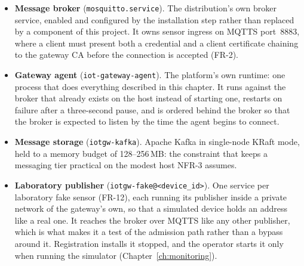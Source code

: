 \documentclass[12pt,a4paper]{report}
\begin{document}
\begin{itemize}
    \item \textbf{Message broker} (\texttt{mosquitto.service}).
    The distribution's own broker service, enabled and configured by
    the installation step rather than replaced by a component of this
    project. It owns sensor ingress on MQTTS port~8883, where a
    client must present both a credential and a client certificate
    chaining to the gateway CA before the connection is accepted
    (FR-2).
    \item \textbf{Gateway agent} (\texttt{iot-gateway-agent}).
    The platform's own runtime: one process that does everything
    described in this chapter. It runs against the broker that
    already exists on the host instead of starting one, restarts on
    failure after a three-second pause, and is ordered behind the
    broker so that the broker is expected to listen by the time the
    agent begins to connect.
    \item \textbf{Message storage} (\texttt{iotgw-kafka}). Apache
    Kafka in single-node KRaft mode, held to a memory budget of
    128--256\,MB: the constraint that keeps a messaging tier
    practical on the modest host NFR-3 assumes.
    \item \textbf{Laboratory publisher}
    (\texttt{iotgw-fake@\textless device\_id\textgreater}).
    One service per laboratory fake sensor (FR-12), each running its
    publisher inside a private network of the gateway's own, so that
    a simulated device holds an address like a real one. It reaches
    the broker over MQTTS like any other publisher, which is what
    makes it a test of the admission path rather than a bypass around
    it. Registration installs it stopped, and the operator starts it
    only when running the simulator (Chapter~\ref{ch:monitoring}).
\end{itemize}
\end{document}
